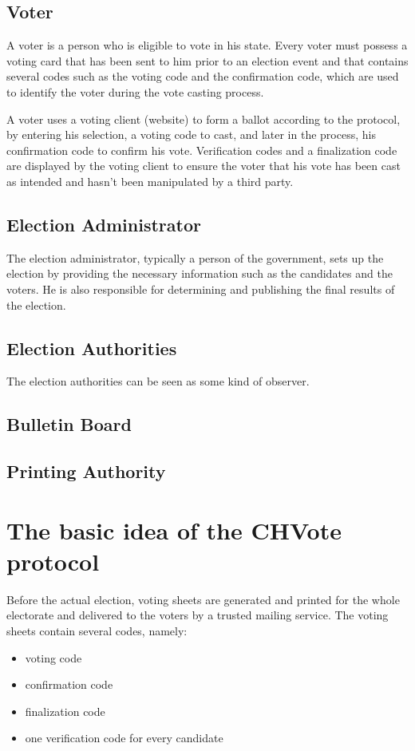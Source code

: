 \subsection{Voter}
A voter is a person who is eligible to vote in his state. Every voter must possess a voting card that has been sent to him prior to an election event and that contains several codes such as the voting code and the confirmation code, which are used to identify the voter during the vote casting process.

A voter uses a voting client (website) to form a ballot according to the protocol, by entering his selection, a voting code to cast, and later in the process, his confirmation code to confirm his vote. Verification codes and a finalization code are displayed by the voting client to ensure the voter that his vote has been cast as intended and hasn't been manipulated by a third party.
\subsection{Election Administrator}
The election administrator, typically a person of the government, sets up the election by providing the necessary information such as the candidates and the voters. He is also responsible for determining and publishing the final results of the election.
\subsection{Election Authorities}
The election authorities can be seen as some kind of observer. 
\subsection{Bulletin Board}
\subsection{Printing Authority}

\section{The basic idea of the CHVote protocol}
Before the actual election, voting sheets are generated and printed for the whole electorate and delivered to the voters by a trusted mailing service. The voting sheets contain several codes, namely:

\begin{itemize}
	\item voting code
	\item confirmation code
	\item finalization code
	\item one verification code for every candidate
\end{itemize}

